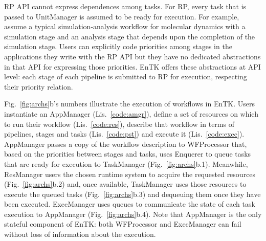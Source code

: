 RP API cannot express dependences among tasks. For RP, every task that is
passed to UnitManager is assumed to be ready for execution. For example,
assume a typical simulation-analysis workflow for molecular dynamics with a
simulation stage and an analysis stage that depends upon the completion of
the simulation stage. Users can explicitly code priorities among stages in
the applications they write with the RP API but they have no dedicated
abstractions in that API for expressing those priorities. EnTK offers these
abstractions at API level: each stage of each pipeline is submitted to RP for
execution, respecting their priority relation.

Fig.~\ref{fig:archs}b's numbers illustrate the execution of workflows in
EnTK\@. Users instantiate an AppManager (Lis.~\ref{code:amgr}), define a set
of resources on which to run their workflow (Lis.~\ref{code:res}), describe
that workflow in terms of pipelines, stages and tasks (Lis.~\ref{code:pst})
and execute it (Lis.~\ref{code:exec}). AppManager passes a copy of the
workflow description to WFProcessor that, based on the priorities between
stages and tasks, uses Enquerer to queue tasks that are ready for execution
to TaskManager (Fig.~\ref{fig:archs}b.1). Meanwhile, ResManager users
the chosen runtime system to acquire the requested resources
(Fig.~\ref{fig:archs}b.2) and, once available, TaskManager uses those
resources to execute the queued tasks (Fig.~\ref{fig:archs}b.3) and dequeuing
them once they have been executed. ExecManager uses queues to communicate the
state of each task execution to AppManager (Fig.~\ref{fig:archs}b.4). Note
that AppManager is the only stateful component of EnTK\@: both WFProcessor
and ExecManager can fail without loss of information about the execution.

